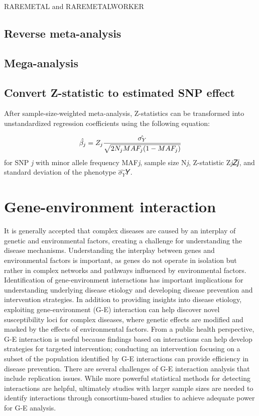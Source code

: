 \documentclass[
]{book}
\begin{document}
RAREMETAL and RAREMETALWORKER

\hypertarget{reverse-meta-analysis}{%
\section{Reverse meta-analysis}\label{reverse-meta-analysis}}

\hypertarget{mega-analysis}{%
\section{Mega-analysis}\label{mega-analysis}}

\hypertarget{convert-z-statistic-to-estimated-snp-effect}{%
\section{Convert Z-statistic to estimated SNP effect}\label{convert-z-statistic-to-estimated-snp-effect}}

After sample-size-weighted meta-analysis, Z-statistics can be transformed into unstandardized regression coefficients using the following equation:

\[\LARGE \hat{\beta_j} = Z_j\frac{\hat{\sigma_Y}}{\sqrt{2N_j MAF_j(1-MAF_j)}}\]
for SNP \emph{j} with minor allele frequency MAF\emph{j}, sample size N\emph{j}, Z-statistic Z\emph{j}𝑍𝑗, and standard deviation of the phenotype \(\hat{\sigma_Y}\)𝑌.

\hypertarget{gene-environment-interaction}{%
\chapter{Gene-environment interaction}\label{gene-environment-interaction}}

It is generally accepted that complex diseases are caused by an interplay of genetic and environmental factors, creating a challenge for understanding the disease mechanisms. Understanding the interplay between genes and environmental factors is important, as genes do not operate in isolation but rather in complex networks and pathways influenced by environmental factors.
Identification of gene-environment interactions has important implications for understanding underlying disease etiology and developing disease prevention and intervention strategies.
In addition to providing insights into disease etiology, exploiting gene-environment (G-E) interaction can help discover novel susceptibility loci for complex diseases, where genetic effects are modified and masked by the effects of environmental factors.
From a public health perspective, G-E interaction is useful because findings based on interactions can help develop strategies for targeted intervention; conducting an intervention focusing on a subset of the population identified by G-E interactions can provide efficiency in disease prevention.
There are several challenges of G-E interaction analysis that include replication issues. While more powerful statistical methods for detecting interactions are helpful, ultimately studies with larger sample sizes are needed to identify interactions through consortium-based studies to achieve adequate power for G-E analysis.
\end{document}
